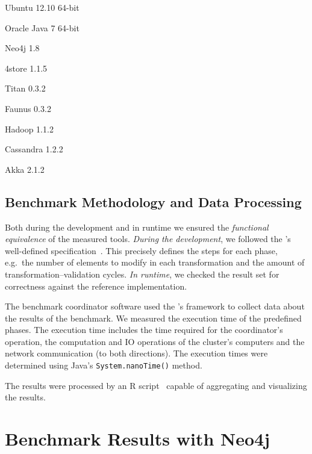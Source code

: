 \begin{itemize*}
  \item Ubuntu 12.10 64-bit
  \item Oracle Java 7 64-bit
  \item Neo4j 1.8
  \item 4store 1.1.5
  \item Titan 0.3.2
  \item Faunus 0.3.2
  \item Hadoop 1.1.2
  \item Cassandra 1.2.2
  \item Akka 2.1.2
\end{itemize*}

\subsection{Benchmark Methodology and Data Processing}
\label{benchmark-methodology}

Both during the development and in runtime we ensured the \emph{functional equivalence} of the measured tools. \emph{During the development}, we followed the \tb{}'s well-defined specification~\cite{ASE2013}. This precisely defines the steps for each phase, e.g.\ the number of elements to modify in each transformation and the amount of transformation--validation cycles. \emph{In runtime}, we checked the result set for correctness against the reference implementation. 

The benchmark coordinator software used the \tb{}'s framework to collect data about the results of the benchmark. We measured the execution time of the predefined phases. The execution time includes the time required for the coordinator's operation, the computation and IO operations of the cluster's computers and the network communication (to both directions). The execution times were determined using Java's \texttt{System.nanoTime()} method.

The results were processed by an R script~\cite{RProject} capable of aggregating and visualizing the results. 


\section{Benchmark Results with Neo4j}
\label{benchmark-neo4j}


